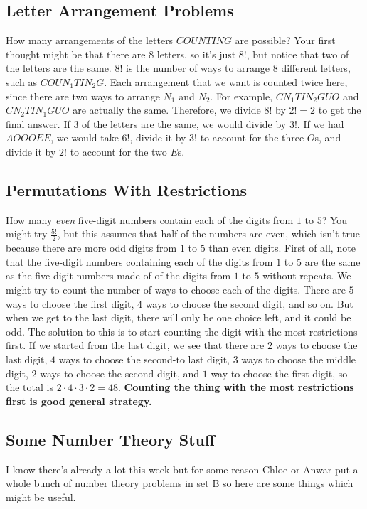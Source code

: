 \documentclass[twocolumn]{article}
\begin{document}
\subsection*{Letter Arrangement Problems}
How many arrangements of the letters $COUNTING$ are possible? Your first thought 
might be that there are $8$ letters, so it's just $8!$, but notice that two of 
the letters are the same. $8!$ is the number of ways to arrange $8$ different 
letters, such as $COUN_1 TIN_2 G$. Each arrangement that we want is counted 
twice here, since there are two ways to arrange $N_1$ and $N_2$. For example, 
$CN_1 TIN_2 GUO$ and $CN_2 TIN_1 GUO$ are actually the same. Therefore, we 
divide $8!$ by $2! = 2$ to get the final answer. If $3$ of the letters are the 
same, we would divide by $3!$. If we had $AOOOEE$, we would take $6!$, divide it 
by $3!$ to account for the three $O$s, and divide it by $2!$ to account for the 
two $E$s.

\subsection*{Permutations With Restrictions}
How many \emph{even} five-digit numbers contain each of the digits from $1$ to 
$5$? You might try $\frac{5!}{2}$, but this assumes that half of the numbers are 
even, which isn't true because there are more odd digits from $1$ to $5$ than 
even digits. First of all, note that the five-digit numbers containing each of 
the digits from $1$ to $5$ are the same as the five digit numbers made of of the 
digits from $1$ to $5$ without repeats. We might try to count the number of ways 
to choose each of the digits. There are $5$ ways to choose the first digit, $4$ 
ways to choose the second digit, and so on. But when we get to the last digit, 
there will only be one choice left, and it could be odd. The solution to this is 
to start counting the digit with the most restrictions first. If we started from 
the last digit, we see that there are $2$ ways to choose the last digit, $4$ 
ways to choose the second-to last digit, $3$ ways to choose the middle digit, 
$2$ ways to choose the second digit, and $1$ way to choose the first digit, so 
the total is $2 \cdot 4 \cdot 3 \cdot 2 = 48$. \textbf{Counting the thing with 
the most restrictions first is good general strategy.}

\subsection*{Some Number Theory Stuff}
I know there's already a lot this week but for some reason Chloe or Anwar put a 
whole bunch of number theory problems in set B so here are some things which 
might be useful.
\end{document}
